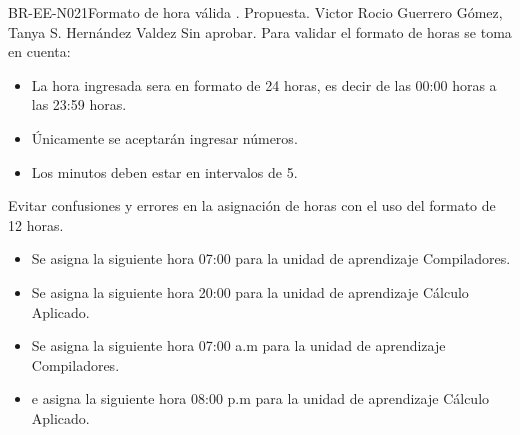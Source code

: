 \begin{BusinessRule}{BR-EE-N021}{Formato de hora válida}
	{\bcCondition}    %
	{\btEnabler}     %
	{\blControlling}    %
	.
	\BRItem[Estado] Propuesta.
	 Victor
	 Rocio Guerrero Gómez, Tanya S. Hernández Valdez
	 Sin aprobar.
	\BRItem[Descripción] Para validar el formato de horas se toma en cuenta:
	\begin{itemize}
		\item La hora ingresada sera en formato de 24 horas, es decir de las 00:00 horas a las  23:59 horas.
		\item Únicamente se aceptarán ingresar números.
		\item Los minutos deben estar en intervalos de 5.
	\end{itemize}
	\BRItem[Motivación] Evitar confusiones y errores en la asignación de horas con el uso del formato de 12 horas.
	 \cdtEmpty
		\begin{itemize}
			\item Se asigna la siguiente hora 07:00 para la unidad de aprendizaje Compiladores. 
			\item Se asigna la siguiente hora 20:00 para la unidad de aprendizaje Cálculo Aplicado.
		\end{itemize}
	 \cdtEmpty
		\begin{itemize}
			\item Se asigna la siguiente hora 07:00 a.m para la unidad de aprendizaje Compiladores. 
			\item e asigna la siguiente hora 08:00 p.m para la unidad de aprendizaje Cálculo Aplicado.
		\end{itemize}
\end{BusinessRule}

